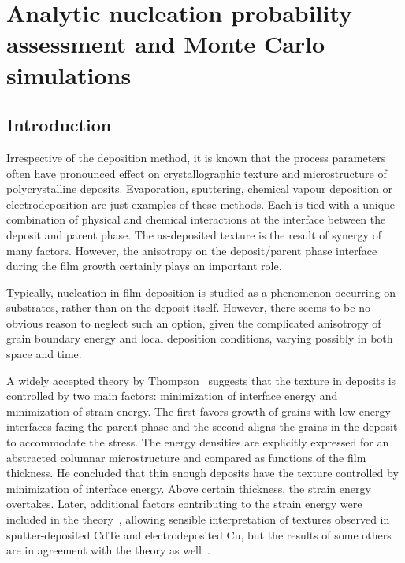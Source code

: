 \chapter{Analytic nucleation probability assessment and Monte Carlo simulations}\label{ch_paper2}
\section{Introduction}
\label{sec_Intro}
Irrespective of the deposition method, it is known that the process parameters often have pronounced effect on crystallographic texture and microstructure of polycrystalline deposits. Evaporation, sputtering, chemical vapour deposition or electrodeposition are just examples of these methods. Each is tied with a unique combination of physical and chemical interactions at the interface between the deposit and parent phase. The as-deposited texture is the result of synergy of many factors. However, the anisotropy on the deposit/parent phase interface during the film growth certainly plays an important role. 

Typically, nucleation in film deposition is studied as a phenomenon occurring on substrates, rather than on the deposit itself. However, there seems to be no obvious reason to neglect such an option, given the complicated anisotropy of grain boundary energy and local deposition conditions, varying possibly in both space and time. 

A widely accepted theory by Thompson~\cite{Thompson1993} suggests that the texture in deposits is controlled by two main factors: minimization of interface energy and minimization of strain energy. The first favors growth of grains with low-energy interfaces facing the parent phase and the second aligns the grains in the deposit to accommodate the stress. The energy densities are explicitly expressed for an abstracted columnar microstructure and compared as functions of the film thickness. He concluded that thin enough deposits have the texture controlled by minimization of interface energy. Above certain thickness, the strain energy overtakes. Later, additional factors contributing to the strain energy were included in the theory~\cite{Consonni2008}, allowing sensible interpretation of textures observed in sputter-deposited CdTe and electrodeposited Cu, but the results of some others are in agreement with the theory as well~\cite{SonnweberRibic2006, Sanchez1992}. 

